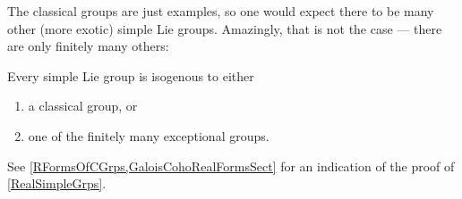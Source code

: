 The classical groups are just examples, so one would expect
there to be many other (more exotic) simple Lie groups.
Amazingly, that is not the case --- there are only finitely many others:

\begin{thm}[(\'E.\,Cartan)] \label{RealSimpleGrps}
 Every simple Lie group is isogenous to either 
 \begin{enumerate}
 \item a classical group, or
 \item one of the finitely many exceptional groups.
 \end{enumerate}
 \end{thm}

 See \cref{RFormsOfCGrps,GaloisCohoRealFormsSect} for an indication of the proof of \cref{RealSimpleGrps}.


